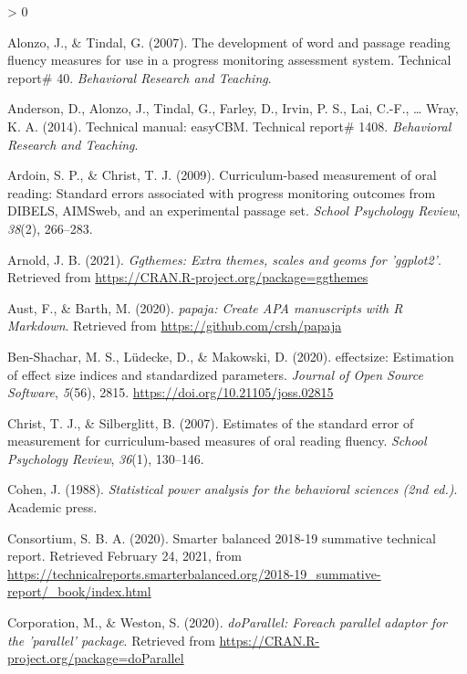 \documentclass[
  english,
  man, fleqn, noextraspace]{apa6}
\newlength{\cslhangindent}
\newenvironment{CSLReferences}[2] %
 {%
  \setlength{\parindent}{0pt}
  \ifodd #1 \everypar{\setlength{\hangindent}{\cslhangindent}}\ignorespaces\fi
  \ifnum #2 > 0
  \setlength{\parskip}{#2\baselineskip}
  \fi
 }%
 {}
\begin{document}
\hypertarget{refs}{}
\begin{CSLReferences}{1}{0}
\leavevmode\hypertarget{ref-alonzotindal2007}{}%
Alonzo, J., \& Tindal, G. (2007). The development of word and passage reading fluency measures for use in a progress monitoring assessment system. Technical report\# 40. \emph{Behavioral Research and Teaching}.

\leavevmode\hypertarget{ref-anderson2014tech}{}%
Anderson, D., Alonzo, J., Tindal, G., Farley, D., Irvin, P. S., Lai, C.-F., \ldots{} Wray, K. A. (2014). Technical manual: easyCBM. Technical report\# 1408. \emph{Behavioral Research and Teaching}.

\leavevmode\hypertarget{ref-ardoin2009}{}%
Ardoin, S. P., \& Christ, T. J. (2009). Curriculum-based measurement of oral reading: Standard errors associated with progress monitoring outcomes from DIBELS, AIMSweb, and an experimental passage set. \emph{School Psychology Review}, \emph{38}(2), 266--283.

\leavevmode\hypertarget{ref-R-ggthemes}{}%
Arnold, J. B. (2021). \emph{Ggthemes: Extra themes, scales and geoms for 'ggplot2'}. Retrieved from \url{https://CRAN.R-project.org/package=ggthemes}

\leavevmode\hypertarget{ref-R-papaja}{}%
Aust, F., \& Barth, M. (2020). \emph{{papaja}: {Create} {APA} manuscripts with {R Markdown}}. Retrieved from \url{https://github.com/crsh/papaja}

\leavevmode\hypertarget{ref-R-effectsize}{}%
Ben-Shachar, M. S., Lüdecke, D., \& Makowski, D. (2020). {e}ffectsize: Estimation of effect size indices and standardized parameters. \emph{Journal of Open Source Software}, \emph{5}(56), 2815. \url{https://doi.org/10.21105/joss.02815}

\leavevmode\hypertarget{ref-christ2007}{}%
Christ, T. J., \& Silberglitt, B. (2007). Estimates of the standard error of measurement for curriculum-based measures of oral reading fluency. \emph{School Psychology Review}, \emph{36}(1), 130--146.

\leavevmode\hypertarget{ref-cohen1988}{}%
Cohen, J. (1988). \emph{Statistical power analysis for the behavioral sciences (2nd ed.)}. Academic press.

\leavevmode\hypertarget{ref-sbac}{}%
Consortium, S. B. A. (2020). Smarter balanced 2018-19 summative technical report. Retrieved February 24, 2021, from \url{https://technicalreports.smarterbalanced.org/2018-19_summative-report/_book/index.html}

\leavevmode\hypertarget{ref-R-doParallel}{}%
Corporation, M., \& Weston, S. (2020). \emph{doParallel: Foreach parallel adaptor for the 'parallel' package}. Retrieved from \url{https://CRAN.R-project.org/package=doParallel}


\end{CSLReferences}
\end{document}
